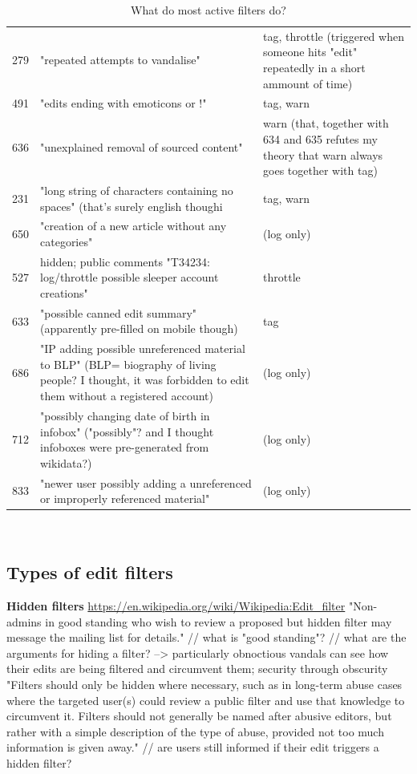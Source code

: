 \documentclass{sigchi}
\begin{document}
\begin{table}
\begin{tabular}{r p{10cm} p{5cm} }
      279 & "repeated attempts to vandalise" & tag, throttle (triggered when someone hits "edit" repeatedly in a short ammount of time) \\
      491 & "edits ending with emoticons or !" & tag, warn \\
      636 & "unexplained removal of sourced content" & warn (that, together with 634 and 635 refutes my theory that warn always goes together with tag) \\
      231 & "long string of characters containing no spaces" (that's surely english though^^) & tag, warn \\
      650 & "creation of a new article without any categories" & (log only) \\
      527 & hidden; public comments "T34234: log/throttle possible sleeper account creations" & throttle \\
      633 & "possible canned edit summary" (apparently pre-filled on mobile though) & tag \\
      686 & "IP adding possible unreferenced material to BLP" (BLP= biography of living people? I thought, it was forbidden to edit them without a registered account) & (log only) \\
      712 & "possibly changing date of birth in infobox" ("possibly"? and I thought infoboxes were pre-generated from wikidata?) & (log only) \\
      833 & "newer user possibly adding a unreferenced or improperly referenced material" & (log only) \\
  \end{tabular}
  \caption{What do most active filters do?}~\label{tab:most-active-actions}
\end{table}

\subsection{Types of edit filters}

\textbf{Hidden filters}
\url{https://en.wikipedia.org/wiki/Wikipedia:Edit_filter}
"Non-admins in good standing who wish to review a proposed but hidden filter may message the mailing list for details."
// what is "good standing"?
// what are the arguments for hiding a filter? --> particularly obnoctious vandals can see how their edits are being filtered and circumvent them; security through obscurity
"Filters should only be hidden where necessary, such as in long-term abuse cases where the targeted user(s) could review a public filter and use that knowledge to circumvent it. Filters should not generally be named after abusive editors, but rather with a simple description of the type of abuse, provided not too much information is given away."
// are users still informed if their edit triggers a hidden filter?
\end{document}
